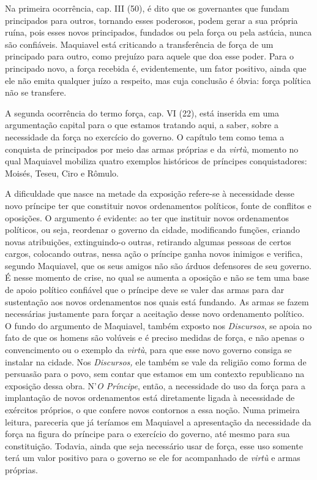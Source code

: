 Na primeira ocorrência, cap. III (50), é dito que os governantes que
fundam principados para outros, tornando esses poderosos, podem gerar a
sua própria ruína, pois esses novos principados, fundados ou pela força
ou pela astúcia, nunca são confiáveis. Maquiavel está criticando a
transferência de força de um principado para outro, como prejuízo para
aquele que doa esse poder. Para o principado novo, a força recebida é,
evidentemente, um fator positivo, ainda que ele não emita qualquer juízo
a respeito, mas cuja conclusão é óbvia: força política não se transfere.

A segunda ocorrência do termo força, cap. VI (22), está inserida em uma
argumentação capital para o que estamos tratando aqui, a saber, sobre a
necessidade da força no exercício do governo. O capítulo tem como tema a
conquista de principados por meio das armas próprias e da \emph{virtù},
momento no qual Maquiavel mobiliza quatro exemplos históricos de
príncipes conquistadores: Moisés, Teseu, Ciro e Rômulo.

A dificuldade que nasce na metade da exposição refere-se à necessidade
desse novo príncipe ter que constituir novos ordenamentos políticos,
fonte de conflitos e oposições. O argumento é evidente: ao ter que
instituir novos ordenamentos políticos, ou seja, reordenar o governo da
cidade, modificando funções, criando novas atribuições, extinguindo-o
outras, retirando algumas pessoas de certos cargos, colocando outras,
nessa ação o príncipe ganha novos inimigos e verifica, segundo
Maquiavel, que os seus amigos não são árduos defensores de seu governo.
É nesse momento de crise, no qual se aumenta a oposição e não se tem uma
base de apoio político confiável que o príncipe deve se valer das armas
para dar sustentação aos novos ordenamentos nos quais está fundando. As
armas se fazem necessárias justamente para forçar a aceitação desse novo
ordenamento político. O fundo do argumento de Maquiavel, também exposto
nos \emph{Discursos}, se apoia no fato de que os homens são volúveis e é
preciso medidas de força, e não apenas o convencimento ou o exemplo da
\emph{virtù}, para que esse novo governo consiga se instalar na cidade.
Nos \emph{Discursos,} ele também se vale da religião como forma de
persuasão para o povo, sem contar que estamos em um contexto republicano
na exposição dessa obra. N'\emph{O Príncipe}, então, a necessidade do
uso da força para a implantação de novos ordenamentos está diretamente
ligada à necessidade de exércitos próprios, o que confere novos
contornos a essa noção. Numa primeira leitura, pareceria que já teríamos
em Maquiavel a apresentação da necessidade da força na figura do
príncipe para o exercício do governo, até mesmo para sua constituição.
Todavia, ainda que seja necessário usar de força, esse uso somente terá
um valor positivo para o governo se ele for acompanhado de \emph{virtù}
e armas próprias.

